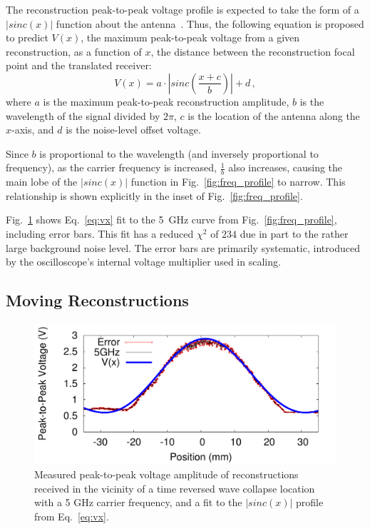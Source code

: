 The reconstruction peak-to-peak voltage profile is expected to take the form of
a $\left|sinc(x)\right|$ function about the antenna~\cite{lerosey-focusing}.
%
Thus, the following equation is proposed to predict $V(x)$, the maximum
peak-to-peak voltage from a given reconstruction, as a function of $x$, the
distance between the reconstruction focal point and the translated receiver:
%
\begin{equation}\label{eq:vx}
V(x)=a\cdot \left|sinc\left(\frac{x+c}{b}\right)\right|+d\,,
\end{equation}
%
\noindent where $a$ is the maximum peak-to-peak reconstruction amplitude, $b$ is
the wavelength of the signal divided by $2\pi$, $c$ is the location of the
antenna along the $x$-axis, and $d$ is the noise-level offset voltage.



Since $b$ is proportional to the wavelength (and inversely proportional to
frequency), as the carrier frequency is increased, $\frac{1}{b}$ also increases,
causing the main lobe of the $\left|sinc(x)\right|$ function in
Fig.~\ref{fig:freq_profile} to narrow.
%
This relationship is shown explicitly in the inset of
Fig.~\ref{fig:freq_profile}.



Fig.~\ref{fig:error_fit} shows Eq.~\ref{eq:vx} fit to the 5~GHz curve from
Fig.~\ref{fig:freq_profile}, including error bars.
%
This fit has a reduced $\chi^2$ of $234$ due in part to the rather
large background noise level.
%
The error bars are primarily systematic, introduced by the oscilloscope's internal
voltage multiplier used in scaling.

\subsection{Moving Reconstructions}
\label{sec:moving}


\begin{figure}[t!]
\includegraphics[width=\columnwidth]{figs/fit.pdf}
\caption{Measured peak-to-peak voltage amplitude of reconstructions received in the
vicinity of a time reversed wave collapse location with a 5 GHz carrier
frequency, and a fit to the $\left|sinc(x)\right|$ profile from Eq.~\ref{eq:vx}.}
\label{fig:error_fit}
\end{figure}


